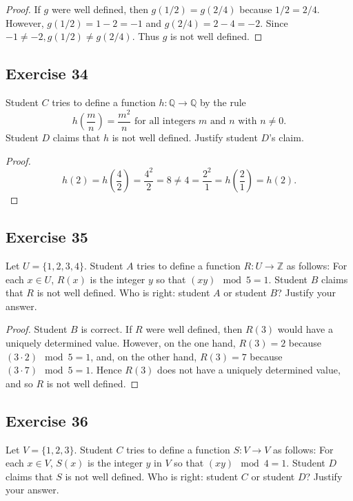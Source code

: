 \documentclass[14pt]{extarticle}
\newcommand{\Q}{\mathbb{Q}}
\newcommand{\Z}{\mathbb{Z}}
\begin{document}
\begin{proof}
If $g$ were well defined, then \(g(1/2) = g(2/4)\) because \(1/2 = 2/4\). However, \(g(1/2) = 1 - 2 = -1\) and 
\(g(2/4) = 2 - 4 = -2\). Since \(-1 \neq -2, g(1/2) \neq g(2/4)\). Thus $g$ is not well defined.
\end{proof}

\subsection{Exercise 34}
Student $C$ tries to define a function \(h: \Q \to \Q\) by
the rule
\[
h \left(\frac{m}{n}\right) = \frac{m^2}{n} \text{ for all integers } m \text{ and } n \text{ with } n \neq 0.
\]
Student $D$ claims that $h$ is not well defined. Justify student $D$'s claim.

\begin{proof}
\[
h(2) = h\left(\frac{4}{2}\right) = \frac{4^2}{2} = 8 \neq 4 = \frac{2^2}{1} = h\left(\frac{2}{1}\right) = h(2).
\]
\end{proof}

\subsection{Exercise 35}
Let \(U = \{1, 2, 3, 4\}\). Student $A$ tries to define a function \(R: U \to \Z\) as follows: For each \(x \in U\), 
\(R(x)\) is the integer $y$ so that \((xy) \mod 5 = 1\). Student $B$ claims that $R$ is not well defined. Who is 
right: student $A$ or student $B$? Justify your answer.

\begin{proof}
Student $B$ is correct. If $R$ were well defined, then $R(3)$ would have a uniquely determined value. However, on 
the one hand, \(R(3) = 2\) because \((3 \cdot 2) \mod 5 = 1\), and, on the other hand, \(R(3) = 7\) because 
\((3 \cdot 7) \mod 5 = 1\). Hence \(R(3)\) does not have a uniquely determined value, and so $R$ is not well defined.
\end{proof}

\subsection{Exercise 36}
Let \(V = \{1, 2, 3\}\). Student $C$ tries to define a function \(S: V \to V\) as follows: For each \(x \in V\), 
\(S(x)\) is the integer $y$ in $V$ so that \((xy) \mod 4 = 1\). Student $D$ claims that $S$ is not well defined. Who 
is right: student $C$ or student $D$? Justify your answer.
\end{document}
